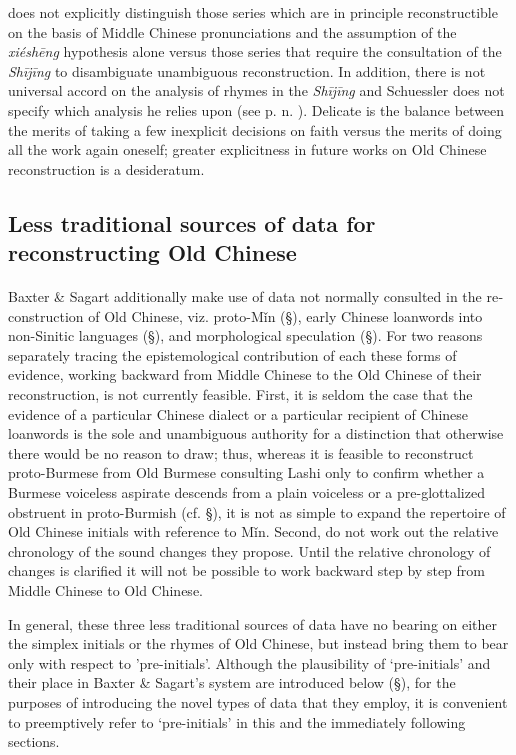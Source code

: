 \citet[]{Schuessler2009minimal}
does not explicitly distinguish those series which are
in principle reconstructible on the basis of Middle Chinese
pronunciations and the assumption of the \emph{xiéshēng} hypothesis
alone versus those series that require the consultation of the
 \emph{Shījīng} to disambiguate unambiguous reconstruction. In addition,
there is not universal accord on the analysis of rhymes in the
 \emph{Shījīng} and Schuessler does not specify which analysis he relies
upon (see p. n. ). Delicate is the balance between the merits of taking
a few inexplicit decisions on faith versus the merits of doing all the
work again oneself; greater explicitness in future works on Old Chinese
reconstruction is a desideratum.

\subsection{Less traditional sources of data for reconstructing Old
Chinese}\label{less-traditional-sources-of-data-for-reconstructing-old-chinese}

\paragraph{}Baxter \& Sagart additionally
make use of data not normally consulted in the re­con­struction of Old
Chinese, viz. proto-Mǐn (§), early Chinese loan­words into non-Sinitic
languages (§), and morphological spec­u­la­tion (§). For two reasons
separately tracing the epistemo­logical contribution of each these forms
of evidence, working backward from Middle Chinese to the Old Chinese of
their reconstruction, is not currently feasible. First, it is seldom the
case that the evidence of a particular Chinese dialect or a particular
recipient of Chinese loanwords is the sole and unambiguous authority for
a distinction that otherwise there would be no reason to draw; thus,
whereas it is feasible to reconstruct proto-Burmese from Old Burmese
consulting Lashi only to confirm whether a Burmese voiceless aspirate
descends from a plain voiceless or a pre-glottalized obstruent in
proto-Burmish (cf. §), it is not as simple to expand the repertoire of
Old Chinese initials with reference to Mǐn. Second, 
\citet[]{Baxter2014OldChinese}
do not work out the relative chronology of the sound changes they
propose. Until the relative chronology of changes is clarified it will
not be possible to work backward step by step from Middle Chinese to Old
Chinese.

In general, these three less traditional sources of data have no bearing
on either the simplex initials or the rhymes of Old Chinese, but instead
\citet[]{Baxter2014OldChinese}
bring them to bear only with respect to
'pre-initials'. Although the plausibility of `pre-initials' and their
place in Baxter \& Sagart's system are introduced below (§), for the
purposes of introducing the novel types of data that they employ, it is
convenient to preemptively refer to `pre-initials' in this and the
immediately following sections.

